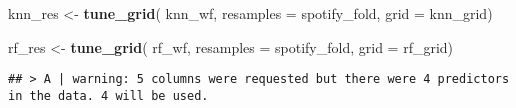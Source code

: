 \documentclass[
]{article}
\newenvironment{Shaded}{\begin{snugshade}}{\end{snugshade}}
\newcommand{\AttributeTok}[1]{\textcolor[rgb]{0.13,0.29,0.53}{#1}}
\newcommand{\FunctionTok}[1]{\textcolor[rgb]{0.13,0.29,0.53}{\textbf{#1}}}
\newcommand{\NormalTok}[1]{#1}
\newcommand{\OtherTok}[1]{\textcolor[rgb]{0.56,0.35,0.01}{#1}}
\begin{document}
\begin{Shaded}
\begin{Highlighting}[]
\NormalTok{knn\_res }\OtherTok{\textless{}{-}} \FunctionTok{tune\_grid}\NormalTok{(}
\NormalTok{  knn\_wf,}
  \AttributeTok{resamples =}\NormalTok{ spotify\_fold,  }
  \AttributeTok{grid =}\NormalTok{ knn\_grid)}

\NormalTok{ rf\_res }\OtherTok{\textless{}{-}} \FunctionTok{tune\_grid}\NormalTok{(}
\NormalTok{  rf\_wf,}
  \AttributeTok{resamples =}\NormalTok{ spotify\_fold,}
  \AttributeTok{grid =}\NormalTok{ rf\_grid)}
\end{Highlighting}
\end{Shaded}

\begin{verbatim}
## > A | warning: 5 columns were requested but there were 4 predictors in the data. 4 will be used.
\end{verbatim}
\end{document}
